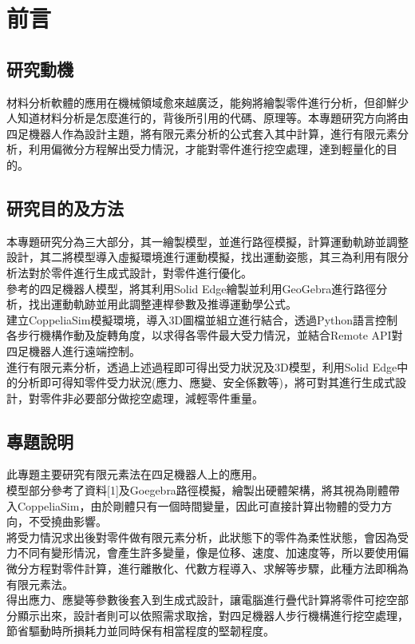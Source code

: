 \chapter{前言}
\renewcommand{\baselinestretch}{10.0} %
\setcounter{page}{1}  %
\fontsize{14pt}{2.5pt}\sectionef

\section{研究動機}
材料分析軟體的應用在機械領域愈來越廣泛，能夠將繪製零件進行分析，但卻鮮少人知道材料分析是怎麼進行的，背後所引用的代碼、原理等。本專題研究方向將由四足機器人作為設計主題，將有限元素分析的公式套入其中計算，進行有限元素分析，利用偏微分方程解出受力情況，才能對零件進行挖空處理，達到輕量化的目的。\\

\section{研究目的及方法}
本專題研究分為三大部分，其一繪製模型，並進行路徑模擬，計算運動軌跡並調整設計，其二將模型導入虛擬環境進行運動模擬，找出運動姿態，其三為利用有限分析法對於零件進行生成式設計，對零件進行優化。\\
參考的四足機器人模型，將其利用Solid Edge繪製並利用GeoGebra進行路徑分析，找出運動軌跡並用此調整連桿參數及推導運動學公式。\\
建立CoppeliaSim模擬環境，導入3D圖檔並組立進行結合，透過Python語言控制各步行機構作動及旋轉角度，以求得各零件最大受力情況，並結合Remote API對四足機器人進行遠端控制。\\
進行有限元素分析，透過上述過程即可得出受力狀況及3D模型，利用Solid Edge中的分析即可得知零件受力狀況(應力、應變、安全係數等)，將可對其進行生成式設計，對零件非必要部分做挖空處理，減輕零件重量。\\

\section{專題說明}
此專題主要研究有限元素法在四足機器人上的應用。\\
模型部分參考了資料[1]及Goegebra路徑模擬，繪製出硬體架構，將其視為剛體帶入CoppeliaSim，由於剛體只有一個時間變量，因此可直接計算出物體的受力方向，不受撓曲影響。\\
將受力情況求出後對零件做有限元素分析，此狀態下的零件為柔性狀態，會因為受力不同有變形情況，會產生許多變量，像是位移、速度、加速度等，所以要使用偏微分方程對零件計算，進行離散化、代數方程導入、求解等步驟，此種方法即稱為有限元素法。\\
得出應力、應變等參數後套入到生成式設計，讓電腦進行疊代計算將零件可挖空部分顯示出來，設計者則可以依照需求取捨，對四足機器人步行機構進行挖空處理，節省驅動時所損耗力並同時保有相當程度的堅韌程度。\\

\renewcommand{\baselinestretch}{0.5} %

